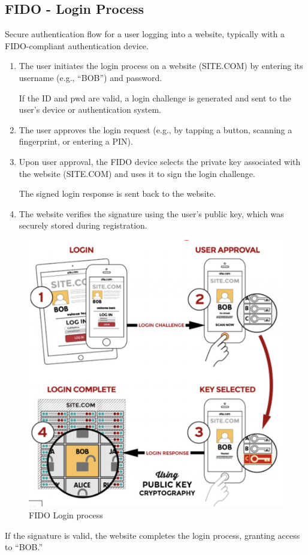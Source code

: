 \subsection*{FIDO - Login Process}
Secure authentication flow for a user logging into a website, typically with a FIDO-compliant authentication device.
\begin{multicols}{2}

    \begin{enumerate}
        \item The user initiates the login process on a website (SITE.COM) by entering its username (e.g., “BOB”) and password.

        If the ID and pwd are valid, a login challenge is generated and sent to the user's device or authentication system.
        \item The user approves the login request (e.g., by tapping a button, scanning a fingerprint, or entering a PIN).
        \item Upon user approval, the FIDO device selects the private key associated with the website (SITE.COM) and uses it to sign the login challenge.
        
        The signed login response is sent back to the website.
        \item The website verifies the signature using the user's public key, which was securely stored during registration.
    \end{enumerate}
    \columnbreak

    \begin{figure}[H]
        \centering
        \includegraphics[width=\linewidth]{Images/Authentication/fidolog.png}
        \caption{FIDO Login process}
    \end{figure}
    
\end{multicols}
If the signature is valid, the website completes the login process, granting access to “BOB.”
\clearpage
